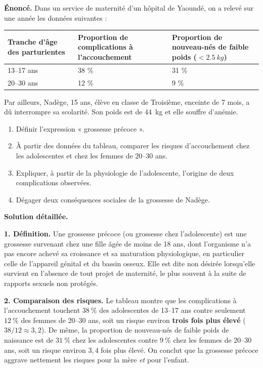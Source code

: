 \documentclass[11pt]{article}
\newcommand{\cle}[1]{{\popxbold\color{popdark}#1}}
\begin{document}
\begin{exoresolu}
\textbf{Énoncé.} Dans un service de maternité d'un hôpital de Yaoundé, on a relevé sur une année les données suivantes :

\begin{center}
\begin{tabularx}{\linewidth}{|l|X|X|}\hline
\rowcolor{popblueL} Tranche d'âge des parturientes & Proportion de complications à l'accouchement & Proportion de nouveau-nés de faible poids ($< \SI{2,5}{kg}$) \\ \hline
13--17 ans & 38 \% & 31 \% \\ \hline
20--30 ans & 12 \% & 9 \% \\ \hline
\end{tabularx}
\end{center}

Par ailleurs, Nadège, 15 ans, élève en classe de Troisième, enceinte de 7 mois, a dû interrompre sa scolarité. Son poids est de \SI{44}{kg} et elle souffre d'anémie.
\begin{enumerate}
\item Définir l'expression « grossesse précoce ».
\item À partir des données du tableau, comparer les risques d'accouchement chez les adolescentes et chez les femmes de 20--30 ans.
\item Expliquer, à partir de la physiologie de l'adolescente, l'origine de deux complications observées.
\item Dégager deux conséquences sociales de la grossesse de Nadège.
\end{enumerate}
\tcblower
\textbf{Solution détaillée.}

\textbf{1. Définition.} Une \cle{grossesse précoce} (ou grossesse chez l'adolescente) est une grossesse survenant chez une fille âgée de moins de 18 ans, dont l'organisme n'a pas encore achevé sa croissance et sa maturation physiologique, en particulier celle de l'appareil génital et du bassin osseux. Elle est dite \cle{non désirée} lorsqu'elle survient en l'absence de tout projet de maternité, le plus souvent à la suite de rapports sexuels non protégés.

\textbf{2. Comparaison des risques.} Le tableau montre que les complications à l'accouchement touchent $38\ \%$ des adolescentes de 13--17 ans contre seulement $12\ \%$ des femmes de 20--30 ans, soit un risque environ \textbf{trois fois plus élevé} ($38/12 \approx 3,2$). De même, la proportion de nouveau-nés de faible poids de naissance est de $31\ \%$ chez les adolescentes contre $9\ \%$ chez les femmes de 20--30 ans, soit un risque environ $3,4$ fois plus élevé. On conclut que la grossesse précoce aggrave nettement les risques pour la mère \emph{et} pour l'enfant.


\end{exoresolu}
\end{document}
